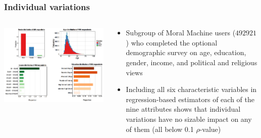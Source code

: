 \documentclass[aspectratio=169]{beamer}
\begin{document}
\begin{frame}
    \frametitle{Individual variations}
    \begin{columns}
        \begin{column}{0.6\linewidth}
            \includegraphics[width=1.0\linewidth]{assets/demographics-mme.png}
        \end{column}
        \begin{column}{0.4\linewidth}
            \begin{itemize}
                \item Subgroup of Moral Machine users ($492921$) who completed the optional demographic survey on age, education, gender, income, and political and religious views
                \item Including all six characteristic variables in regression-based estimators of each of the nine attributes shows that individual variations have no sizable impact on any of them (all below 0.1 $\rho$-value)
            \end{itemize}
        \end{column}
    \end{columns}
\end{frame}
\end{document}
